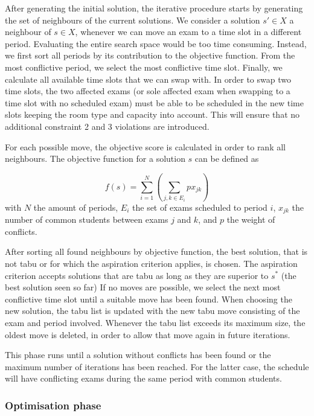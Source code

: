 After generating the initial solution, the iterative procedure starts by generating the set of neighbours of the current solutions. We consider a solution $s' \in X$ a neighbour of $s \in X$, whenever we can move an exam to a time slot in a different period. Evaluating the entire search space would be too time consuming. Instead, we first sort all periods by its contribution to the objective function. From the most conflictive period, we select the most conflictive time slot. Finally, we calculate all available time slots that we can swap with. In order to swap two time slots, the two affected exams (or sole affected exam when swapping to a time slot with no scheduled exam) must be able to be scheduled in the new time slots keeping the room type and capacity into account. This will ensure that no additional constraint 2 and 3 violations are introduced.

For each possible move, the objective score is calculated in order to rank all neighbours. The objective function for a solution $s$ can be defined as

\begin{equation}
    f(s) = \sum_{i=1}^{N} ( \sum_{j,k \in E_i}^{}p x_{jk})
\end{equation}
with $N$ the amount of periods, $E_i$ the set of exams scheduled to period $i$, $x_{jk}$ the number of common students between exams $j$ and $k$,
and $p$ the weight of conflicts.

After sorting all found neighbours by objective function, the best solution, that is not tabu or for which the aspiration criterion applies, is chosen. The aspiration criterion accepts solutions that are tabu as long as they are superior to $s^*$ (the best solution seen so far) If no moves are possible, we select the next most conflictive time slot until a suitable move has been found. When choosing the new solution, the tabu list is updated with the new tabu move consisting of the exam and period involved. Whenever the tabu list exceeds its maximum size, the oldest move is deleted, in order to allow that move again in future iterations.

This phase runs until a solution without conflicts has been found or the maximum number of iterations has been reached. For the latter case, the schedule will have conflicting exams during the same period with common students.

\subsubsection{Optimisation phase}

